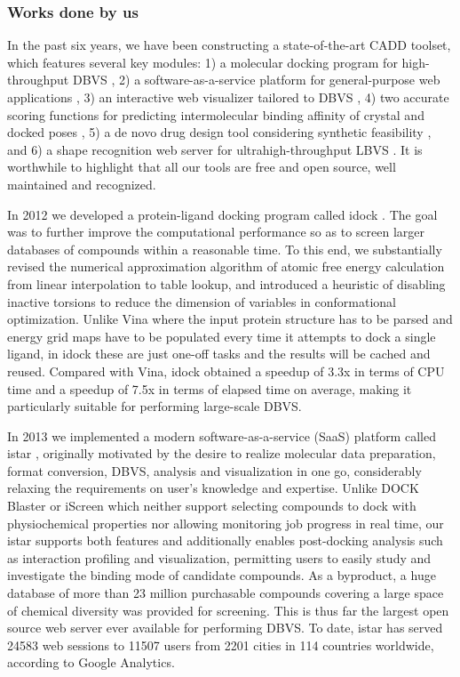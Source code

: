 \documentclass[a4paper,12pt]{article}
\begin{document}
\subsubsection*{Works done by us}

In the past six years, we have been constructing a state-of-the-art CADD toolset, which features several key modules: 1) a molecular docking program for high-throughput DBVS \citep{1153}, 2) a software-as-a-service platform for general-purpose web applications \citep{1362}, 3) an interactive web visualizer tailored to DBVS \citep{1366,1265}, 4) two accurate scoring functions for predicting intermolecular binding affinity of crystal and docked poses \citep{1647,1796,1433,1795,1797,1434}, 5) a de novo drug design tool considering synthetic feasibility \citep{1409,1387}, and 6) a shape recognition web server for ultrahigh-throughput LBVS \citep{1749}. It is worthwhile to highlight that all our tools are free and open source, well maintained and recognized.

In 2012 we developed a protein-ligand docking program called idock \citep{1153}. The goal was to further improve the computational performance so as to screen larger databases of compounds within a reasonable time. To this end, we substantially revised the numerical approximation algorithm of atomic free energy calculation from linear interpolation to table lookup, and introduced a heuristic of disabling inactive torsions to reduce the dimension of variables in conformational optimization. Unlike Vina where the input protein structure has to be parsed and energy grid maps have to be populated every time it attempts to dock a single ligand, in idock these are just one-off tasks and the results will be cached and reused. Compared with Vina, idock obtained a speedup of 3.3x in terms of CPU time and a speedup of 7.5x in terms of elapsed time on average, making it particularly suitable for performing large-scale DBVS.

In 2013 we implemented a modern software-as-a-service (SaaS) platform called istar \citep{1362}, originally motivated by the desire to realize molecular data preparation, format conversion, DBVS, analysis and visualization in one go, considerably relaxing the requirements on user's knowledge and expertise. Unlike DOCK Blaster or iScreen which neither support selecting compounds to dock with physiochemical properties nor allowing monitoring job progress in real time, our istar supports both features and additionally enables post-docking analysis such as interaction profiling and visualization, permitting users to easily study and investigate the binding mode of candidate compounds. As a byproduct, a huge database of more than 23 million purchasable compounds covering a large space of chemical diversity was provided for screening. This is thus far the largest open source web server ever available for performing DBVS. To date, istar has served 24583 web sessions to 11507 users from 2201 cities in 114 countries worldwide, according to Google Analytics.
\end{document}
